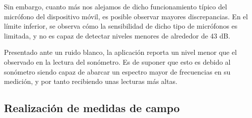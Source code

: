     Sin embargo, cuanto más nos alejamos de dicho funcionamiento típico del micrófono del dispositivo móvil, es posible observar mayores discrepancias. En el límite inferior, se observa cómo la sensibilidad de dicho tipo de micrófonos es limitada, y no es capaz de detectar niveles menores de alrededor de 43 dB.

    Presentado ante un ruido blanco, la aplicación reporta un nivel menor que el observado en la lectura del sonómetro. Es de suponer que esto es debido al sonómetro siendo capaz de abarcar un espectro mayor de frecuencias en su medición, y por tanto recibiendo unas lecturas más altas. 

\subsection{Realización de medidas de campo}
